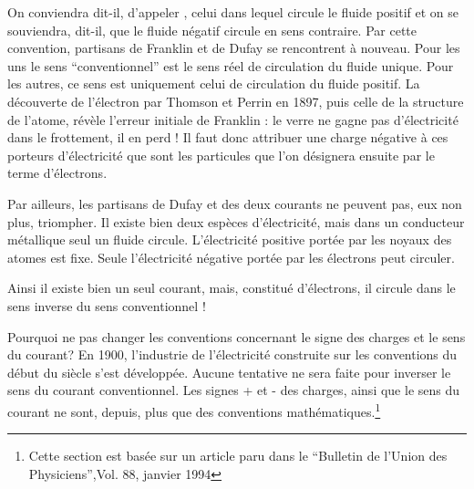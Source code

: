 \begin{tcolorbox}[colback=mygray1,breakable,colframe=mygray2,sharp corners=northwest,title=Sens conventionnel et sens réel du courant électrique]
    On conviendra dit-il, d'appeler  , celui dans lequel circule le fluide positif et on se souviendra, dit-il, que le fluide négatif circule en sens contraire. Par cette convention, partisans de Franklin et de Dufay se rencontrent à nouveau. Pour les uns le sens \enquote{conventionnel} est le sens réel de circulation du fluide unique. Pour les autres, ce sens est uniquement celui de circulation du fluide positif.
    La découverte de l'électron par Thomson et Perrin en 1897, puis celle de la structure de l'atome, révèle l'erreur initiale de Franklin : le verre ne gagne pas d'électricité dans le frottement, il en perd ! Il faut donc attribuer une charge négative à ces porteurs d'électricité que sont les particules que l'on désignera ensuite par le terme d'électrons.

    Par ailleurs, les partisans de Dufay et des deux courants ne peuvent pas, eux non plus, triompher. Il existe bien deux espèces d'électricité, mais dans un conducteur métallique seul un fluide circule. L'électricité positive portée par les noyaux des atomes est fixe. Seule l'électricité négative portée par les électrons peut circuler.

    Ainsi il existe bien un seul courant, mais, constitué d'électrons, il circule dans le sens inverse du sens conventionnel !

    Pourquoi ne pas changer les conventions concernant le signe des charges et le sens du courant? En 1900, l'industrie de l'électricité construite sur les conventions du début du siècle s'est développée. Aucune tentative ne sera faite pour inverser le sens du courant conventionnel. Les signes + et - des charges, ainsi que le sens du courant ne sont, depuis, plus que des conventions mathématiques.\footnote{Cette section est basée sur un article paru dans le \enquote{Bulletin de l'Union des Physiciens},Vol. 88, janvier 1994}

\end{tcolorbox}
